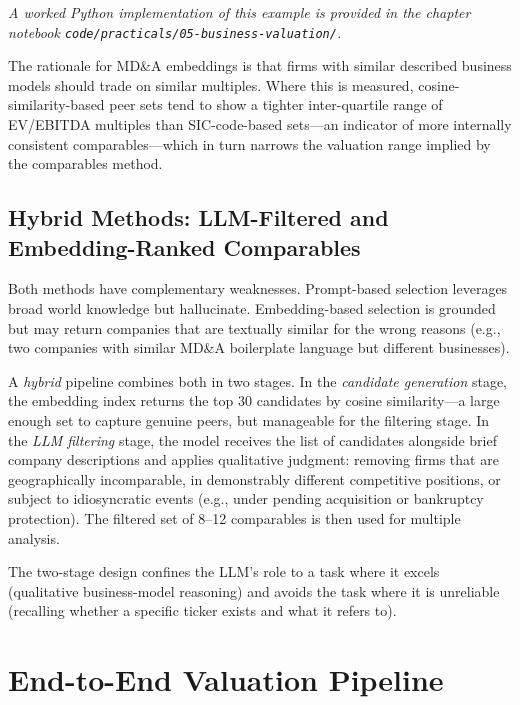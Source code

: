 \begin{deepdive}
\textit{A worked Python implementation of this example is provided in the chapter notebook \texttt{code/practicals/05-business-valuation/}.}

The rationale for MD\&A embeddings is that firms with similar described business models
should trade on similar multiples. Where this is measured, cosine-similarity-based peer
sets tend to show a tighter inter-quartile range of EV/EBITDA multiples than
SIC-code-based sets---an indicator of more internally consistent comparables---which in
turn narrows the valuation range implied by the comparables method.

\subsection{Hybrid Methods: LLM-Filtered and Embedding-Ranked Comparables}
\label{subsec:bv-comparables-hybrid}

Both methods have complementary weaknesses. Prompt-based selection leverages broad
world knowledge but hallucinate. Embedding-based selection is grounded but may
return companies that are textually similar for the wrong reasons (e.g., two
companies with similar MD\&A boilerplate language but different businesses).

A \emph{hybrid} pipeline combines both in two stages. In the \emph{candidate
generation} stage, the embedding index returns the top 30 candidates by cosine
similarity---a large enough set to capture genuine peers, but manageable for the
filtering stage. In the \emph{LLM filtering} stage, the model receives the list of
candidates alongside brief company descriptions and applies qualitative judgment:
removing firms that are geographically incomparable, in demonstrably different
competitive positions, or subject to idiosyncratic events (e.g., under pending
acquisition or bankruptcy protection). The filtered set of 8--12 comparables is
then used for multiple analysis.

The two-stage design confines the LLM's role to a task where it excels (qualitative
business-model reasoning) and avoids the task where it is unreliable (recalling
whether a specific ticker exists and what it refers to).
\end{deepdive}


\section{End-to-End Valuation Pipeline}
\label{sec:bv-pipeline}

